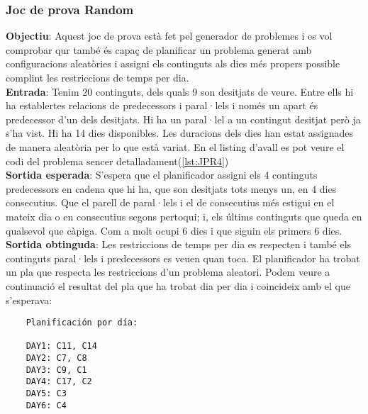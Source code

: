 \documentclass[a4paper]{article}
\begin{document}
	\subsubsection{Joc de prova Random}
	\textbf{Objectiu}: Aquest joc de prova està fet pel generador de problemes i es vol comprobar qur també és capaç de planificar un problema generat amb configuracions aleatòries i assigni els continguts als dies més propers possible complint les restriccions de temps per dia.\\
	\textbf{Entrada}: Tenim 20 continguts, dels quals 9 son desitjats de veure. Entre ells hi ha establertes relacions de predecessors i paral·lels i només un apart és predecessor d'un dels desitjats. Hi ha un paral·lel a un contingut desitjat però ja s'ha vist. Hi ha 14 dies disponibles. Les duracions dels dies han estat assignades de manera aleatòria per lo que està variat. En el listing d'avall es pot veure el codi del problema sencer detalladament(\ref{lst:JPR4})\\
	\textbf{Sortida esperada}: S'espera que el planificador assigni els 4 continguts predecessors en cadena que hi ha, que son desitjats tots menys un, en 4 dies consecutius. Que el parell de paral·lels i el de consecutius més estigui en el mateix dia o en consecutius segons pertoqui; i, els últims continguts que queda en qualsevol que càpiga. Com a molt ocupi 6 dies i que siguin els primers 6 dies.\\
	\textbf{Sortida obtinguda}: Les restriccions de temps per dia es respecten i també els continguts paral·lels i predecessors es veuen quan toca. El planificador ha trobat un pla que respecta les restriccions d'un problema aleatori.  Podem veure a continuació el resultat del pla que ha trobat dia per dia i coincideix amb el que s'esperava:\\
	
	\begin{verbatim}
	Planificación por día:
	
	DAY1: C11, C14
	DAY2: C7, C8
	DAY3: C9, C1
	DAY4: C17, C2
	DAY5: C3
	DAY6: C4
	\end{verbatim}
	
\end{document}
